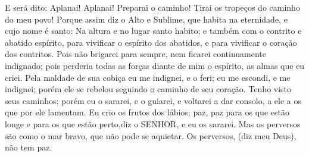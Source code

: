 {  E será dito: Aplanai! Aplanai! Preparai o caminho! Tirai os tropeços do caminho do meu povo!
  Porque assim diz o Alto e Sublime, que habita na eternidade, e cujo nome é santo: Na altura e no lugar santo habito; e também com o contrito e abatido espírito, para vivificar o espírito dos abatidos, e para vivificar o coração dos contritos.
  Pois não brigarei para sempre, nem ficarei continuamente indignado; pois perderia todas as forças diante de mim o espírito, as almas que eu criei.
  Pela maldade de sua cobiça eu me indignei, e o feri; eu me escondi, e me indignei; porém ele se rebelou seguindo o caminho de seu coração.
  Tenho visto seus caminhos; porém eu o sararei, e o guiarei, e voltarei a dar consolo, a ele a os que por ele lamentam.
  Eu crio os frutos dos lábios; paz, paz para os que estão longe e para os que estão perto,diz o SENHOR, e eu os sararei.
  Mas os perversos são como o mar bravo, que não pode se aquietar.
  Os perversos, (diz meu Deus), não tem paz.
\par }

